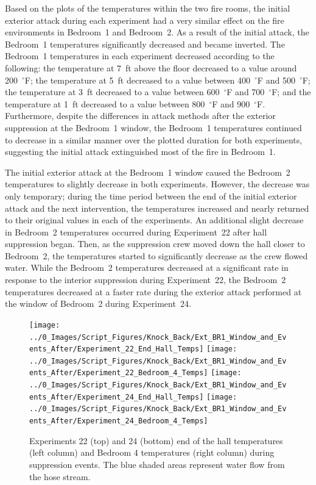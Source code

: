 \documentclass[12pt,oneside]{book}
\begin{document}
Based on the plots of the temperatures within the two fire rooms, the initial exterior attack during each experiment had a very similar effect on the fire environments in Bedroom~1 and Bedroom~2. As a result of the initial attack, the Bedroom~1 temperatures significantly decreased and became inverted. The Bedroom~1 temperatures in each experiment decreased according to the following: the temperature at 7~ft above the floor decreased to a value around 200~$^\circ$F; the temperature at 5~ft decreased to a value between 400~$^\circ$F and 500~$^\circ$F; the temperature at 3~ft decreased to a value between 600~$^\circ$F and 700~$^\circ$F; and the temperature at 1~ft decreased to a value between 800~$^\circ$F and 900~$^\circ$F. Furthermore, despite the differences in attack methods after the exterior suppression at the Bedroom~1 window, the Bedroom~1 temperatures continued to decrease in a similar manner over the plotted duration for both experiments, suggesting the initial attack extinguished most of the fire in Bedroom~1.

The initial exterior attack at the Bedroom~1 window caused the Bedroom~2 temperatures to slightly decrease in both experiments. However, the decrease was only temporary; during the time period between the end of the initial exterior attack and the next intervention, the temperatures increased and nearly returned to their original values in each of the experiments. An additional slight decrease in Bedroom~2 temperatures occurred during Experiment~22 after hall suppression began. Then, as the suppression crew moved down the hall closer to Bedroom~2, the temperatures started to significantly decrease as the crew flowed water. While the Bedroom~2 temperatures decreased at a significant rate in response to the interior suppression during Experiment~22, the Bedroom~2 temperatures decreased at a faster rate during the exterior attack performed at the window of Bedroom~2 during Experiment~24.

\begin{figure}[!ht]
	\centering
	\texttt{[image: ../0\_Images/Script\_Figures/Knock\_Back/Ext\_BR1\_Window\_and\_Events\_After/Experiment\_22\_End\_Hall\_Temps]}
	\texttt{[image: ../0\_Images/Script\_Figures/Knock\_Back/Ext\_BR1\_Window\_and\_Events\_After/Experiment\_22\_Bedroom\_4\_Temps]}
	\texttt{[image: ../0\_Images/Script\_Figures/Knock\_Back/Ext\_BR1\_Window\_and\_Events\_After/Experiment\_24\_End\_Hall\_Temps]}
	\texttt{[image: ../0\_Images/Script\_Figures/Knock\_Back/Ext\_BR1\_Window\_and\_Events\_After/Experiment\_24\_Bedroom\_4\_Temps]}
	\caption[Exterior Attack with Additional Attack --- End of Hall \& Bedroom~4 Temperatures]{Experiments 22 (top) and 24 (bottom) end of the hall temperatures (left column) and Bedroom 4 temperatures (right column) during suppression events. The blue shaded areas represent water flow from the hose stream.}
	\label{fig:knockback_ext_3}
\end{figure}
\end{document}
